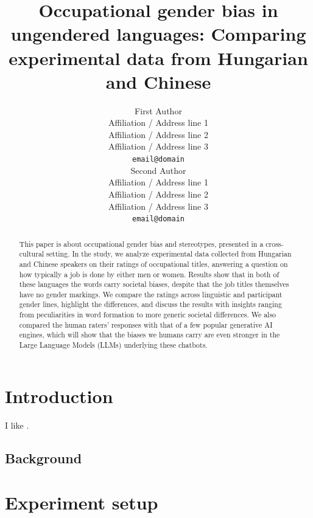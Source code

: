 \documentclass[11pt]{article}
\title{Occupational gender bias in ungendered languages: Comparing experimental data from Hungarian and Chinese}
\author{First Author \\
  Affiliation / Address line 1 \\
  Affiliation / Address line 2 \\
  Affiliation / Address line 3 \\
  \texttt{email@domain} \\\And
  Second Author \\
  Affiliation / Address line 1 \\
  Affiliation / Address line 2 \\
  Affiliation / Address line 3 \\
  \texttt{email@domain} \\}
\begin{document}
\maketitle

\begin{abstract}
This paper is about occupational gender bias and stereotypes, presented in a cross-cultural setting. In the study, we analyze experimental data collected from Hungarian and Chinese speakers on their ratings of occupational titles, answering a question on how typically a job is done by either men or women. Results show that in both of these languages the words carry societal biases, despite that the job titles themselves have no gender markings. We compare the ratings across linguistic and participant gender lines, highlight the differences, and discuss the results with insights ranging from peculiarities in word formation to more generic societal differences. We also compared the human raters' responses with that of a few popular generative AI engines, which will show that the biases we humans carry are even stronger in the Large Language Models (LLMs) underlying these chatbots.
\end{abstract}


\section{Introduction}

I like \citet{kaukonen_2025_gender}.


\subsection{Background}

\section{Experiment setup}
\end{document}
